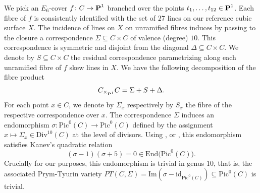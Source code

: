 \documentclass[11pt]{amsart}
\theoremstyle{definition}
\def\PP{{\textbf P}}
\begin{document}
\vskip 4pt

We pick an $E_6$-cover $f\colon C\rightarrow \PP^1$ branched over the points $t_1, \ldots, t_{12}\in \PP^1$. Each fibre of $f$ is consistently identified  with the set of $27$ lines on our reference cubic surface $X$. The incidence of lines on $X$ on unramified fibres induces by passing to the closure a correspondence $\Sigma\subseteq C\times C$ of valence (degree) $10$. This correspondence is symmetric and disjoint from the diagonal $\Delta\subseteq C\times C$. We denote by $S\subseteq C\times C$ the residual correspondence parametrizing along each unramified fibre of $f$ skew lines in $X$. We have the following decomposition of the fibre product
$$C_{\times_{\PP^1}} C=\Sigma+S+\Delta.$$
For each point $x\in C$, we denote by $\Sigma_x$ respectively by $S_x$ the fibre of the respective correspondence over $x$. The correspondence $\Sigma$ induces an endomorphism $\sigma\colon \mbox{Pic}^0(C)\rightarrow  \mbox{Pic}^0(C)$ defined by the assignment $x\mapsto \Sigma_x\in \mbox{Div}^{10}(C)$ at the level of divisors. Using \cite{K1}, or \cite[\S1]{ADFIO}, this endomorphism  satisfies Kanev's quadratic relation 
\begin{equation}\label{eq:kanev}
(\sigma-1)(\sigma+5)=0\in \mbox{End}\bigl(\mbox{Pic}^0(C)\bigr).
\end{equation}
Crucially for our purposes, this endomorphism is trivial in genus $10$, that is, the associated Prym-Tyurin variety $PT(C, \Sigma)=\mbox{Im}(\sigma-\mathrm{id}_{\mathrm{Pic}^0(C)})\subseteq \mbox{Pic}^0(C)$ is trivial.
\end{document}
